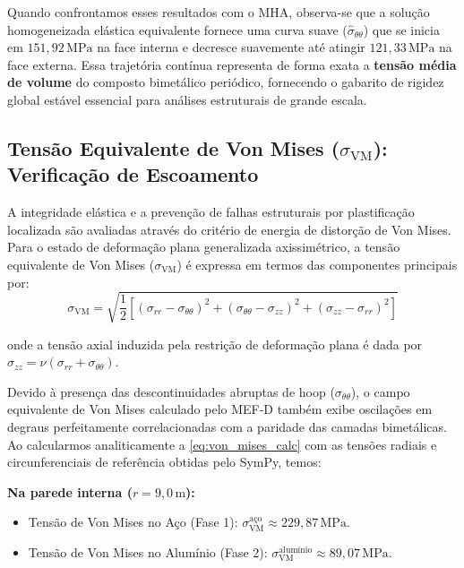 Quando confrontamos esses resultados com o MHA, observa-se que a solução homogeneizada elástica equivalente fornece uma curva suave ($\hat{\sigma}_{\theta\theta}$) que se inicia em $151,92 \, \text{MPa}$ na face interna e decresce suavemente até atingir $121,33 \, \text{MPa}$ na face externa. Essa trajetória contínua representa de forma exata a \textbf{tensão média de volume} do composto bimetálico periódico, fornecendo o gabarito de rigidez global estável essencial para análises estruturais de grande escala.

\subsection{Tensão Equivalente de Von Mises ($\sigma_{\text{VM}}$): Verificação de Escoamento}

A integridade elástica e a prevenção de falhas estruturais por plastificação localizada são avaliadas através do critério de energia de distorção de Von Mises. Para o estado de deformação plana generalizada axissimétrico, a tensão equivalente de Von Mises ($\sigma_{\text{VM}}$) é expressa em termos das componentes principais por:
\begin{equation}
  \sigma_{\text{VM}} = \sqrt{\frac{1}{2} \left[ (\sigma_{rr} - \sigma_{\theta\theta})^2 + (\sigma_{\theta\theta} - \sigma_{zz})^2 + (\sigma_{zz} - \sigma_{rr})^2 \right]}
  \label{eq:von_mises_calc}
\end{equation}

onde a tensão axial induzida pela restrição de deformação plana é dada por $\sigma_{zz} = \nu (\sigma_{rr} + \sigma_{\theta\theta})$.

Devido à presença das descontinuidades abruptas de hoop ($\sigma_{\theta\theta}$), o campo equivalente de Von Mises calculado pelo MEF-D também exibe oscilações em degraus perfeitamente correlacionadas com a paridade das camadas bimetálicas. Ao calcularmos analiticamente a \eqref{eq:von_mises_calc} com as tensões radiais e circunferenciais de referência obtidas pelo SymPy, temos:

\textbf{Na parede interna ($r = 9,0 \, \text{m}$):}
\begin{itemize}
  \item Tensão de Von Mises no Aço (Fase 1): $\sigma_{\text{VM}}^{\text{aço}} \approx 229,87 \, \text{MPa}$.
  \item Tensão de Von Mises no Alumínio (Fase 2): $\sigma_{\text{VM}}^{\text{alumínio}} \approx 89,07 \, \text{MPa}$.
\end{itemize}

